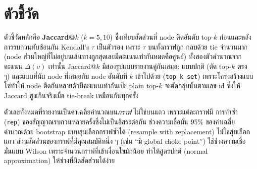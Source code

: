 \section{ตัวชี้วัด}

ตัวชี้วัดหลักคือ \textbf{Jaccard@$k$} ($k=5,10$) ซึ่งเทียบสัดส่วนที่ node ติดอันดับ top-$k$
ก่อนและหลังการรบกวนทับซ้อนกัน Kendall's $\tau$ เป็นตัวรอง เพราะ $\tau$ บนทั้งกราฟถูก
กลบด้วย tie จำนวนมาก (node ส่วนใหญ่ที่ไม่อยู่บนเส้นทางถูกสุดเลยมีคะแนนเท่ากันหมดคือศูนย์)
ทั้งสองตัวคำนวณจากคะแนน $\Delta(v)$ เท่านั้น Jaccard@$k$ มีสองรูปแบบรายงานคู่กันเสมอ:
แบบปกติ (ตัด top-$k$ ตรง ๆ) และแบบที่นับ node ที่เสมอกับ node อันดับที่ $k$ เข้าไปด้วย
(\texttt{top\_k\_set}) เพราะโครงสร้างแบบโซ่ทำให้ node ติดกันหลายตัวมีคะแนนเท่ากันเป๊ะ
plain top-$k$ จะตัดกลุ่มนั้นตามเลข id ซึ่งให้ Jaccard สูงเกินจริงเมื่อ tie-break เหมือนกันทุกครั้ง

ตัวเลขทั้งหมดที่รายงานเป็นค่าเฉลี่ยคำนวณบน\emph{กราฟ} ไม่ใช่บนแถว เพราะแต่ละกราฟมี
การทำซ้ำ (\texttt{rep}) ของสัญญาณรบกวนหลายครั้งซึ่งไม่เป็นอิสระต่อกัน ช่วงความเชื่อมั่น 95\%
ของค่าเฉลี่ยคำนวณด้วย bootstrap แบบสุ่มเลือกกราฟซ้ำได้ (resample with replacement)
ไม่ใช่สุ่มเลือกแถว ส่วนสัดส่วนของกราฟที่มีคุณสมบัติหนึ่ง ๆ (เช่น ``มี global choke point'')
ใช้ช่วงความเชื่อมั่นแบบ Wilson เพราะจำนวนกราฟที่เข้าเงื่อนไขมักน้อย ทำให้สูตรปกติ
(normal approximation) ให้ช่วงที่ผิดสัดส่วนได้ง่าย
